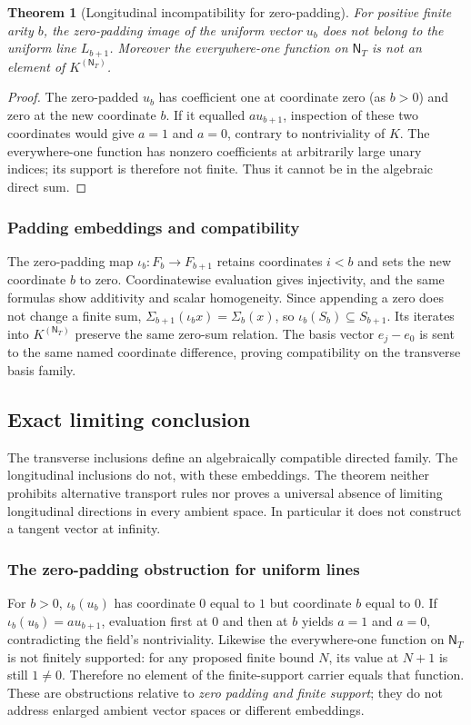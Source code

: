 \documentclass[11pt,reqno]{amsart}
\newtheorem{theorem}{Theorem}[section]
\theoremstyle{definition}\newtheorem{definition}[theorem]{Definition}
\theoremstyle{remark}\newtheorem{remark}[theorem]{Remark}
\newcommand{\N}{\mathsf N_T}\newcommand{\Z}{\mathsf Z_T}\newcommand{\Q}{\mathsf Q_T}\newcommand{\RR}{\mathsf R}
\begin{document}
\begin{theorem}[Longitudinal incompatibility for zero-padding]\label{thm:omegauniform}
For positive finite arity $b$, the zero-padding image of the uniform vector $u_b$ does not belong to the uniform line $L_{b+1}$. Moreover the everywhere-one function on $\N$ is not an element of $K^{(\N)}$.
\end{theorem}
\begin{proof}
The zero-padded $u_b$ has coefficient one at coordinate zero (as $b>0$) and zero at the new coordinate $b$. If it equalled $a u_{b+1}$, inspection of these two coordinates would give $a=1$ and $a=0$, contrary to nontriviality of $K$. The everywhere-one function has nonzero coefficients at arbitrarily large unary indices; its support is therefore not finite. Thus it cannot be in the algebraic direct sum.
\end{proof}


\medskip
\subsubsection*{Padding embeddings and compatibility}\label{supp:9-3}
The zero-padding map $\iota_b:F_b\to F_{b+1}$ retains coordinates $i<b$ and sets the new coordinate $b$ to zero. Coordinatewise evaluation gives injectivity, and the same formulas show additivity and scalar homogeneity. Since appending a zero does not change a finite sum, $\Sigma_{b+1}(\iota_bx)=\Sigma_b(x)$, so $\iota_b(S_b)\subseteq S_{b+1}$. Its iterates into $K^{(\N)}$ preserve the same zero-sum relation. The basis vector $e_j-e_0$ is sent to the same named coordinate difference, proving compatibility on the transverse basis family.
\medskip

\subsection{Exact limiting conclusion}\label{main:sub-30}
The transverse inclusions define an algebraically compatible directed family. The longitudinal inclusions do not, with these embeddings. The theorem neither prohibits alternative transport rules nor proves a universal absence of limiting longitudinal directions in every ambient space. In particular it does not construct a tangent vector at infinity.


\medskip
\subsubsection*{The zero-padding obstruction for uniform lines}\label{supp:9-4}
For $b>0$, $\iota_b(u_b)$ has coordinate $0$ equal to $1$ but coordinate $b$ equal to $0$. If $\iota_b(u_b)=au_{b+1}$, evaluation first at $0$ and then at $b$ yields $a=1$ and $a=0$, contradicting the field's nontriviality. Likewise the everywhere-one function on $\N$ is not finitely supported: for any proposed finite bound $N$, its value at $N+1$ is still $1\ne0$. Therefore no element of the finite-support carrier equals that function. These are obstructions relative to \emph{zero padding and finite support}; they do not address enlarged ambient vector spaces or different embeddings.
\medskip
\medskip
\end{document}
